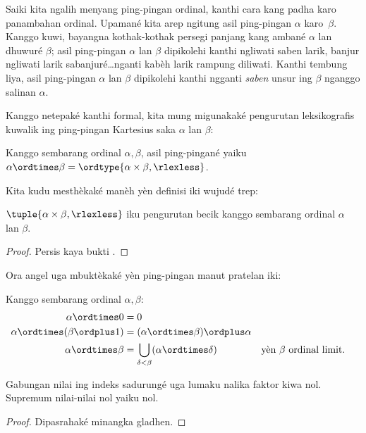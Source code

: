 \documentclass[../../../include/open-logic-section]{subfiles}
\begin{document}


Saiki kita ngalih menyang ping-pingan ordinal, kanthi cara kang
padha karo panambahan ordinal. Upamané kita arep ngitung asil
ping-pingan $\alpha$ karo~$\beta$. Kanggo kuwi, bayangna kothak-kothak
persegi panjang kang ambané $\alpha$ lan dhuwuré $\beta$; asil
ping-pingan $\alpha$ lan $\beta$ dipikolehi kanthi ngliwati saben
larik, banjur ngliwati larik sabanjuré\ldots nganti kabèh larik
rampung diliwati. Kanthi tembung liya, asil ping-pingan $\alpha$
lan $\beta$ dipikolehi kanthi ngganti \emph{saben} unsur ing
$\beta$ nganggo salinan $\alpha$.

Kanggo netepaké kanthi formal, kita mung migunakaké pengurutan
leksikografis kuwalik ing ping-pingan Kartesius saka $\alpha$ lan $\beta$:

\begin{defn}
Kanggo sembarang ordinal $\alpha, \beta$, asil ping-pingané yaiku $\alpha \ordtimes \beta = \ordtype{\alpha \times \beta, \rlexless}$.
\end{defn}
\noindent
Kita kudu mesthèkaké manèh yèn definisi iki wujudé trep:

\begin{lem}
$\tuple{\alpha \times \beta, \rlexless}$ iku pengurutan becik kanggo
sembarang ordinal $\alpha$ lan $\beta$.
\end{lem}

\begin{proof}
Persis kaya bukti .
\end{proof}
\noindent
Ora angel uga mbuktèkaké yèn ping-pingan manut pratelan iki:

\begin{lem}
Kanggo sembarang ordinal $\alpha, \beta$:
\begin{align*}
	\alpha \ordtimes 0 &= 0\\
	\alpha \ordtimes (\beta \ordplus 1) &=
		(\alpha \ordtimes \beta) \ordplus \alpha\\
	\alpha  \ordtimes \beta &=
		\bigcup_{\delta < \beta}(\alpha \ordtimes \delta) &&
		\text{yèn $\beta$ ordinal limit}.
\end{align*}
\end{lem}
Gabungan nilai ing indeks sadurungé uga lumaku nalika faktor kiwa nol. Supremum nilai-nilai nol yaiku nol.

\begin{proof}
Dipasrahaké minangka gladhen.
\end{proof}
\end{document}
